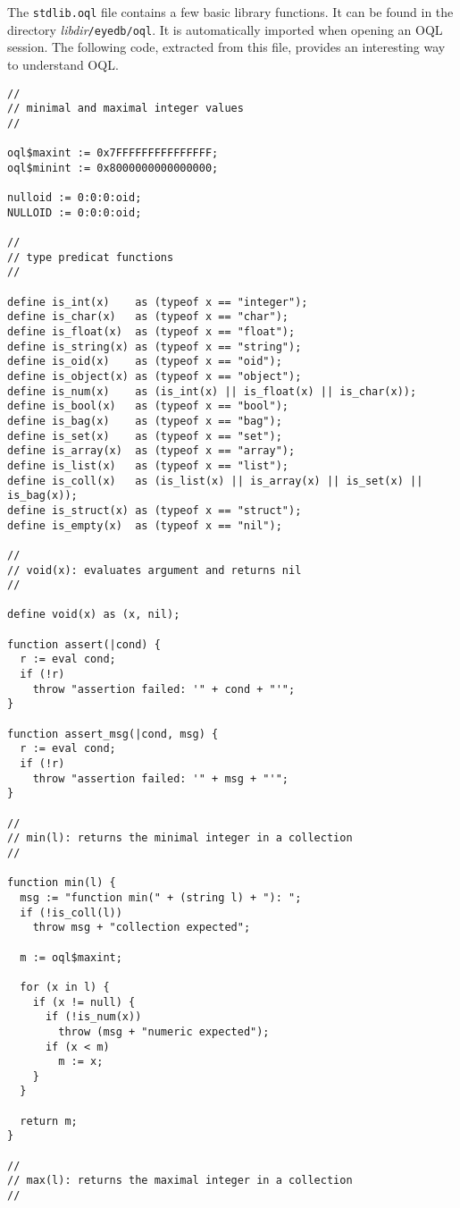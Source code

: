 The \texttt{stdlib.oql} file contains a few basic library functions.
It can be found in the directory \emph{libdir}\texttt{/eyedb/oql}.
It is automatically imported when opening an OQL session.
The following code, extracted from this file, provides an interesting way to
understand OQL.
\begin{verbatim}
//
// minimal and maximal integer values
//

oql$maxint := 0x7FFFFFFFFFFFFFFF;
oql$minint := 0x8000000000000000;

nulloid := 0:0:0:oid;
NULLOID := 0:0:0:oid;

//
// type predicat functions
//

define is_int(x)    as (typeof x == "integer");
define is_char(x)   as (typeof x == "char");
define is_float(x)  as (typeof x == "float");
define is_string(x) as (typeof x == "string");
define is_oid(x)    as (typeof x == "oid");
define is_object(x) as (typeof x == "object");
define is_num(x)    as (is_int(x) || is_float(x) || is_char(x));
define is_bool(x)   as (typeof x == "bool");
define is_bag(x)    as (typeof x == "bag");
define is_set(x)    as (typeof x == "set");
define is_array(x)  as (typeof x == "array");
define is_list(x)   as (typeof x == "list");
define is_coll(x)   as (is_list(x) || is_array(x) || is_set(x) || is_bag(x));
define is_struct(x) as (typeof x == "struct");
define is_empty(x)  as (typeof x == "nil");

//
// void(x): evaluates argument and returns nil
//

define void(x) as (x, nil);

function assert(|cond) {
  r := eval cond;
  if (!r)
    throw "assertion failed: '" + cond + "'";
}

function assert_msg(|cond, msg) {
  r := eval cond;
  if (!r)
    throw "assertion failed: '" + msg + "'";
}

//
// min(l): returns the minimal integer in a collection
//

function min(l) {
  msg := "function min(" + (string l) + "): ";
  if (!is_coll(l))
    throw msg + "collection expected";

  m := oql$maxint;

  for (x in l) {
    if (x != null) {
      if (!is_num(x))
        throw (msg + "numeric expected");
      if (x < m) 
        m := x;
    }
  }

  return m;
}

//
// max(l): returns the maximal integer in a collection
//


\end{verbatim}
